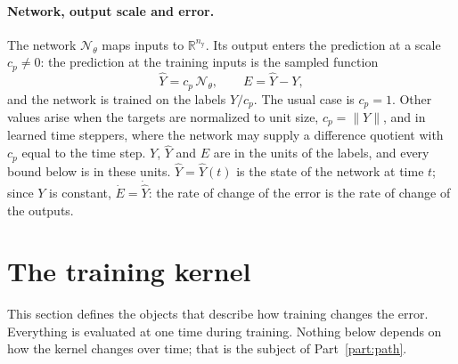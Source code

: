\documentclass[11pt]{article}
\theoremstyle{definition}
\theoremstyle{remark}
\newcommand{\R}{\mathbb{R}}
\newcommand{\Net}{\mathcal{N}_\theta}    %
\begin{document}
\paragraph{Network, output scale and error.}
The network $\Net$ maps inputs to $\R^{n_{\mathrm y}}$.
Its output enters the prediction at a scale $c_p \neq 0$: the prediction at the training inputs is the sampled function
\begin{equation}\label{eq:YYhat}
\hat Y = c_p\,\Net, \qquad E = \hat Y - Y,
\end{equation}
and the network is trained on the labels $Y/c_p$.
The usual case is $c_p = 1$.
Other values arise when the targets are normalized to unit size, $c_p = \|Y\|$, and in learned time steppers, where the network may supply a difference quotient with $c_p$ equal to the time step.
$Y$, $\hat Y$ and $E$ are in the units of the labels, and every bound below is in these units.
$\hat Y = \hat Y(t)$ is the state of the network at time $t$; since $Y$ is constant, $\dot E = \dot{\hat Y}$: the rate of change of the error is the rate of change of the outputs.

\section{The training kernel}\label{sec:kernel}

This section defines the objects that describe how training changes the error.
Everything is evaluated at one time during training.
Nothing below depends on how the kernel changes over time; that is the subject of Part~\ref{part:path}.
\end{document}
